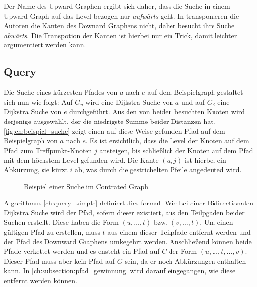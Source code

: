 Der Name des Upward Graphen ergibt sich daher, dass die Suche in einem Upward Graph auf das Level bezogen nur \emph{aufwärts} geht.
In \cite{geisberger2008contraction} transponieren die Autoren die Kanten des Downard Graphens nicht, daher besucht ihre Suche \emph{abwärts}.
Die Transpotion der Kanten ist hierbei nur ein Trick, damit leichter argumentiert werden kann.


\subsection{Query}

Die Suche eines kürzesten Pfades von $a$ nach $e$ auf dem Beispielgraph gestaltet sich nun wie folgt:
Auf $G_u$ wird eine Dijkstra Suche von $a$ und auf $G_d$ eine Dijkstra Suche von $e$ durchgeführt.
Aus den von beiden besuchten Knoten wird derjenige ausgewählt, der die niedrigste Summe beider Distanzen hat.
\autoref{fig:ch:beispiel_suche} zeigt einen auf diese Weise gefunden Pfad auf dem Beispielgraph von $a$ nach $e$.
Es ist ersichtlich, dass die Level der Knoten auf dem Pfad zum Treffpunkt-Knoten $j$ ansteigen, bis schließlich der Knoten auf dem Pfad mit dem höchstem Level gefunden wird.
Die Kante $(a, j)$ ist hierbei ein Abkürzung, sie kürzt $i$ ab, was durch die gestrichelten Pfeile angedeuted wird.

\begin{figure}[ht]
    \centering
    \caption{Beispiel einer Suche im Contrated Graph}
    \label{fig:ch:beispiel_suche}
\end{figure}

Algorithmus \ref{ch:query_simple} definiert dies formal.
Wie bei einer Bidirectionalen Dijkstra Suche wird der Pfad, sofern dieser existiert, aus den Teilpgaden beider Suchen erstellt.
Diese haben die Form $(u, \dotsc, t)$ bzw. $(v, \dotsc, t)$.
Um einen gültigen Pfad zu erstellen, muss $t$ aus einem dieser Teilpfade entfernt werden und der Pfad des Downward Graphens umkegehrt werden.
Anschließend können beide Pfade verkettet werden und es ensteht ein Pfad auf $C$ der Form $(u, \dotsc, t, \dotsc, v)$.
Dieser Pfad muss aber kein Pfad auf $G$ sein, da er noch Abkürzungen enthalten kann.
In \autoref{ch:subsection:pfad_gewinnung} wird darauf eingegangen, wie diese entfernt werden können.

